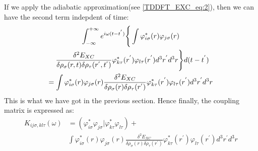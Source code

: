If we apply the adiabatic approximation(see \ref{TDDFT_EXC_eq:2}),
then we can have the second term indepdent of time:
\begin{multline}
\int^{+\infty}_{-\infty}
e^{i\omega(t-t^{'})} \Bigg\{
\int
\varphi^{*}_{i\sigma}(r)\varphi_{j\sigma}(r)\\
\shoveleft{  
\frac{\delta^{2} E_{XC}}
{\delta \rho_{\sigma} (r, t)\delta \rho_{\tau} (r^{'}, t^{'})}
\varphi^{*}_{k\tau}(r^{'})\varphi_{l\tau}(r^{'})
d^{3}r^{'}d^{3}r
\Bigg\} d(t-t^{'})}  \\
= \int
\varphi^{*}_{i\sigma}(r)\varphi_{j\sigma}(r)  
\frac{\delta^{2} E_{XC}}
{\delta \rho_{\sigma} (r)\delta \rho_{\tau} (r^{'})}
\varphi^{*}_{k\tau}(r^{'})\varphi_{l\tau}(r^{'})
d^{3}r^{'}d^{3}r
\end{multline} 
This is what we have got in the previous section. Hence finally, the
coupling matrix is expressed as:
\begin{align}
\label{TDDFT_Casida:14}
 K_{ij\sigma, kl\tau}(\omega) &=
(\varphi^{*}_{i\sigma}\varphi_{j\sigma}|\varphi^{*}_{k\tau}\varphi_{
l\tau}) + \nonumber \\
&\int
\varphi^{*}_{i\sigma}(r)\varphi_{j\sigma}(r)  
\frac{\delta^{2} E_{XC}}
{\delta \rho_{\sigma} (r)\delta \rho_{\tau} (r^{'})}
\varphi^{*}_{k\tau}(r^{'})\varphi_{l\tau}(r^{'})
d^{3}r^{'}d^{3}r
\end{align}

